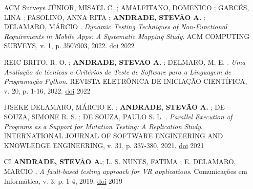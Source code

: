 



\begin{cvhonors}
  \cvhonor
    {ACM Surveys \faLeanpub} %
    {JÚNIOR, MISAEL C. ; AMALFITANO, DOMENICO ; GARCÉS, LINA ; FASOLINO, ANNA RITA ; \textbf{ANDRADE, STEVÃO A.} ; DELAMARO, MÁRCIO . \textit{Dynamic Testing Techniques of Non-Functional Requirements in Mobile Apps: A Systematic Mapping Study}. ACM COMPUTING SURVEYS, v. 1, p. 3507903, 2022.} %
    {\href{http://dx.doi.org/10.1145/3507903}{doi}} %
    {2022} %

  \cvhonor
    {REIC \faLeanpub} %
    {BRITO, R. O. ; \textbf{ANDRADE, STEVAO A.} ; DELMARO, M. E. . \textit{Uma Avaliação de técnicas e Critérios de Teste de Software para a Linguagem de Programação Python}. REVISTA ELETRÔNICA DE INICIAÇÃO CIENTÍFICA, v. 20, p. 1-16, 2022.} %
    {\href{https://sol.sbc.org.br/journals/index.php/reic/article/view/1804}{doi}} %
    {2022} %
    
  \cvhonor
    {IJSEKE \faLeanpub} %
    {DELAMARO, MÁRCIO E. ; \textbf{ANDRADE, STEVÃO A.} ; DE SOUZA, SIMONE R. S. ; DE SOUZA, PAULO S. L. . \textit{Parallel Execution of Programs as a Support for Mutation Testing: A Replication Study}. INTERNATIONAL JOURNAL OF SOFTWARE ENGINEERING AND KNOWLEDGE ENGINEERING, v. 31, p. 337-380, 2021.} %
    {\href{http://dx.doi.org/10.1142/S0218194021500121}{doi}} %
    {2021} %
    
  \cvhonor
    {CI \faLeanpub} %
    {\textbf{ANDRADE, STEVÃO A.}; L. S. NUNES, FATIMA ; E. DELAMARO, MARCIO . \textit{A fault-based testing approach for VR applications}. Comunicações em Informática, v. 3, p. 1-4, 2019.} %
    {\href{http://dx.doi.org/10.22478/ufpb.2595-0622.2019v3n2.49451}{doi}} %
    {2019} %

\end{cvhonors}



